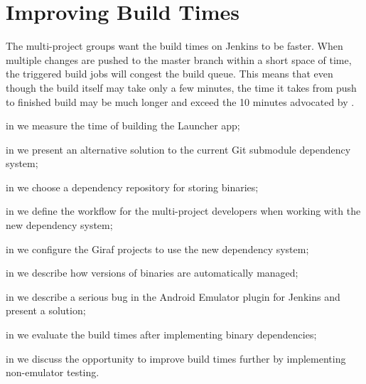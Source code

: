 \chapter{Improving Build Times}
The multi-project groups want the build times on Jenkins to be faster. When multiple changes are pushed to the master branch within a short space of time, the triggered build jobs will congest the build queue. This means that even though the build itself may take only a few minutes, the time it takes from push to finished build may be much longer and exceed the 10 minutes advocated by \textcite{beck2004}.

\begin{chapterorganization}
  \item in  we measure the time of building the Launcher app;
  \item in  we present an alternative solution to the current Git submodule dependency system;
  \item in  we choose a dependency repository for storing binaries;
  \item in  we define the workflow for the multi-project developers when working with the new dependency system;
  \item in  we configure the Giraf projects to use the new dependency system;
  \item in  we describe how versions of binaries are automatically managed;
  \item in  we describe a serious bug in the Android Emulator plugin for Jenkins and present a solution;
  \item in  we evaluate the build times after implementing binary dependencies;
  \item in  we discuss the opportunity to improve build times further by implementing non-emulator testing.
\end{chapterorganization}

